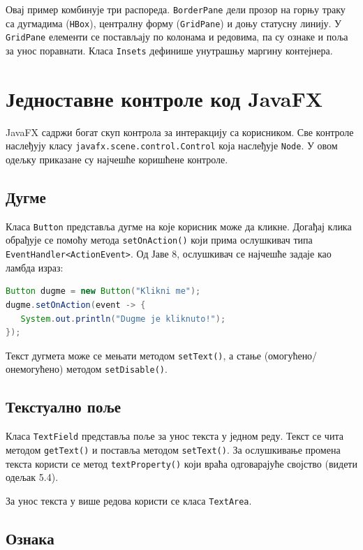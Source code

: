 Овај пример комбинује три распореда. \texttt{BorderPane} дели прозор на горњу траку са дугмадима (\texttt{HBox}), централну форму (\texttt{GridPane}) и доњу статусну линију. У \texttt{GridPane} елементи се постављају по колонама и редовима, па су ознаке и поља за унос поравнати. Класа \texttt{Insets} дефинише унутрашњу маргину контејнера.


\section{Једноставне контроле код JavaFX}

JavaFX садржи богат скуп контрола за интеракцију са корисником. Све контроле наслеђују класу \texttt{javafx.scene.control.Control} која наслеђује \texttt{Node}. У овом одељку приказане су најчешће коришћене контроле.


\subsection{Дугме}

Класа \texttt{Button} представља дугме на које корисник може да кликне. Догађај клика обрађује се помоћу метода \texttt{setOnAction()} који прима ослушкивач типа \texttt{EventHandler\textless{}ActionEvent\textgreater{}}. Од Јаве 8, ослушкивач се најчешће задаје као ламбда израз:


\begin{lstlisting}[language=Java]
Button dugme = new Button("Klikni me");
dugme.setOnAction(event -> {
   System.out.println("Dugme je kliknuto!");
});
\end{lstlisting}


Текст дугмета може се мењати методом \texttt{setText()}, а стање (омогућено/онемогућено) методом \texttt{setDisable()}.


\subsection{Текстуално поље}

Класа \texttt{TextField} представља поље за унос текста у једном реду. Текст се чита методом \texttt{getText()} и поставља методом \texttt{setText()}. За ослушкивање промена текста користи се метод \texttt{textProperty()} који враћа одговарајуће својство (видети одељак 5.4).

За унос текста у више редова користи се класа \texttt{TextArea}.


\subsection{Ознака}

